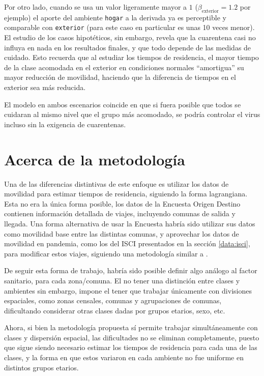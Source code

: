 Por otro lado, cuando se usa un valor ligeramente mayor a \(1\) (\(\beta_{\text{exterior}} = 1.2\) por ejemplo) el aporte del ambiente \texttt{hogar} a la derivada ya es perceptible y comparable con \texttt{exterior} (para este caso en particular es unas 10 veces menor). El estudio de los casos hipotéticos, sin embargo, revela que la cuarentena casi no influya en nada en los resultados finales, y que todo depende de las medidas de cuidado. Esto recuerda que al estudiar los tiempos de residencia, el mayor tiempo de la clase acomodada en el exterior en condiciones normales ``amortigua'' su mayor reducción de movilidad, haciendo que la diferencia de tiempos en el exterior sea más reducida.


El modelo en ambos escenarios coincide en que si fuera posible que todos se cuidaran al mismo nivel que el grupo más acomodado, se podría controlar el virus incluso sin la exigencia de cuarentenas.

\section{Acerca de la metodología}\label{dis:metod}

  



Una de las diferencias distintivas de este enfoque es utilizar los datos de movilidad para estimar tiempos de residencia, siguiendo la forma lagrangiana. Esta no era la única forma posible, los datos de la Encuesta Origen Destino contienen información detallada de viajes, incluyendo comunas de salida y llegada. Una forma alternativa de usar la Encuesta habría sido utilizar sus datos como movilidad base entre las distintas comunas, y aprovechar los datos de movilidad en pandemia, como los del ISCI presentados en la sección \ref{data:isci}, para modificar estos viajes, siguiendo una metodología similar a \cite{Lai2020}.

De seguir esta forma de trabajo, habría sido posible definir algo análogo al factor sanitario, para cada zona/comuna. El no tener una distinción entre clases y ambientes sin embargo, impone el tener que trabajar únicamente con divisiones espaciales, como zonas censales, comunas y agrupaciones de comunas, dificultando considerar otras clases dadas por grupos etarios, sexo, etc.

Ahora, si bien la metodología propuesta sí permite trabajar simultáneamente con clases y dispersión espacial, las dificultades no se eliminan completamente, puesto que sigue siendo necesario estimar los tiempos de residencia para cada una de las clases, y la forma en que estos variaron en cada ambiente no fue uniforme en distintos grupos etarios.

